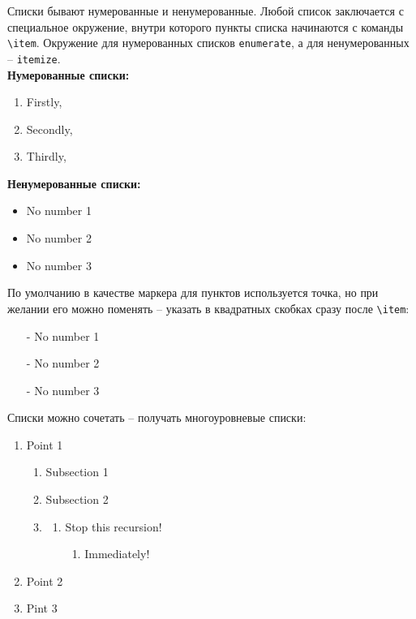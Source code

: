 \documentclass[12pt]{article}
\begin{document}
Списки бывают нумерованные и ненумерованные. Любой список заключается с специальное окружение, внутри которого пункты списка начинаются с команды \texttt{\textbackslash item}. Окружение для нумерованных списков \texttt{enumerate}, а для ненумерованных -- \texttt{itemize}. \medskip\\

\textbf{Нумерованные списки:}
\begin{LTXexample}
\begin{enumerate}
\item Firstly, 
\item Secondly,
\item Thirdly,
\end{enumerate}
\end{LTXexample}

\textbf{Ненумерованные списки:}
\begin{LTXexample}
\begin{itemize}
\item No number 1
\item No number 2
\item No number 3
\end{itemize}
\end{LTXexample}

По умолчанию в качестве маркера для пунктов используется точка, но при желании его можно поменять -- указать в квадратных скобках сразу после \texttt{\textbackslash item}:
\begin{LTXexample}
\begin{itemize}
\item[-] No number 1
\item[-] No number 2
\item[-] No number 3
\end{itemize}
\end{LTXexample}

Списки можно сочетать -- получать многоуровневые списки:
\begin{LTXexample}
\begin{enumerate}
\item Point 1
\begin{enumerate}
    \item Subsection 1
    \item Subsection 2
    \item 
    \begin{enumerate}
         \item Stop this recursion!
         \begin{enumerate}
             \item Immediately!
         \end{enumerate}
    \end{enumerate}
\end{enumerate}
\item Point 2
\item Pint 3
\end{enumerate}
\end{LTXexample}
\end{document}
